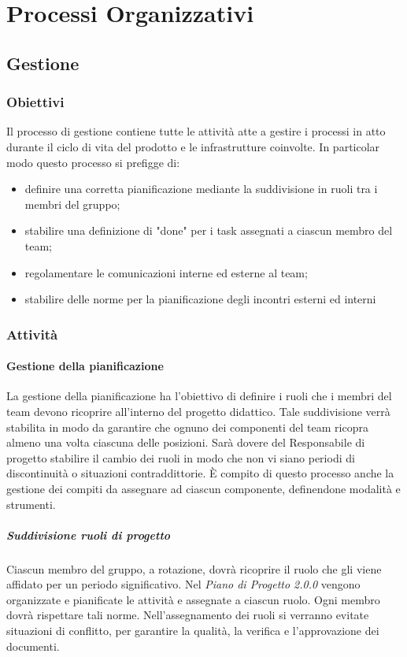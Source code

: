 \section{Processi Organizzativi}

	\subsection{Gestione}
	\subsubsection{Obiettivi}
	Il processo di gestione contiene tutte le attività atte a gestire i processi in atto durante il ciclo di vita del prodotto e le infrastrutture coinvolte.
	In particolar modo questo processo si prefigge di:
	\begin{itemize}
		\item definire una corretta pianificazione mediante la suddivisione in ruoli tra i membri del gruppo;
		\item stabilire una definizione di "done" per i task assegnati a ciascun membro del team;
		\item regolamentare le comunicazioni interne ed esterne al team;
		\item stabilire delle norme per la pianificazione degli incontri esterni ed interni
	\end{itemize}
	
	\subsubsection{Attività}
	\paragraph{Gestione della pianificazione}
	La gestione della pianificazione ha l'obiettivo di definire i ruoli che i membri del team devono ricoprire all'interno del progetto didattico. Tale suddivisione verrà stabilita in modo da garantire che ognuno dei componenti del team ricopra almeno una volta ciascuna delle posizioni. Sarà dovere del Responsabile di progetto stabilire il cambio dei ruoli in modo che non vi siano periodi di discontinuità o situazioni contraddittorie. È compito di questo processo anche la gestione dei compiti da assegnare ad ciascun componente, definendone modalità e strumenti.
	
   		\subparagraph*{Suddivisione ruoli di progetto}
   			Ciascun membro del gruppo, a rotazione, dovrà ricoprire il ruolo che gli viene affidato per un periodo significativo. Nel \textit{Piano di Progetto 2.0.0\docs} vengono organizzate e pianificate le attività e assegnate a ciascun ruolo. Ogni membro dovrà rispettare tali norme.
   			Nell'assegnamento dei ruoli si verranno evitate situazioni di conflitto, per garantire la qualità, la verifica e l'approvazione dei documenti.


